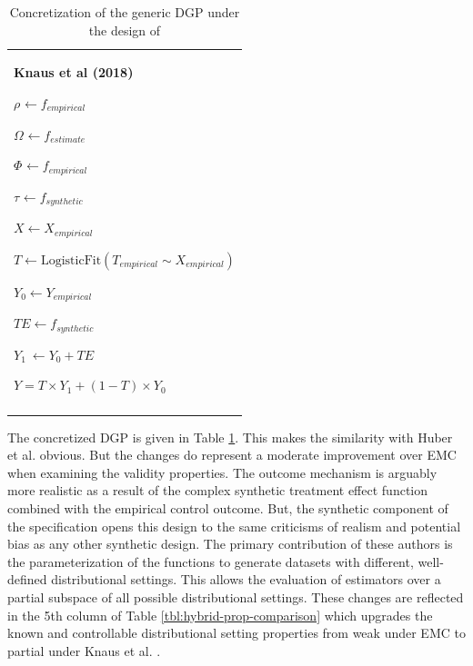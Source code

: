 \documentclass[../main.tex]{subfiles}
\begin{document}
\begin{table}[H]
             \centering
\begin{tabular}{p{3.14in}}
\hline
\multicolumn{1}{|p{3.14in}|}{\textbf{Knaus et al (2018)} \par  \(  \rho _{} \leftarrow f_{empirical}~ \)  \par  \(  \Omega _{} \leftarrow f_{estimate} \)  \par  \(  \Phi _{} \leftarrow f_{empirical} \)  \par  \(  \tau_{} \leftarrow f_{synthetic}~ \)  \par  \( X \leftarrow X_{empirical} \)  \par  \( T \leftarrow \text{LogisticFit} \left(  T_{empirical} \sim X_{empirical} \right)  \)  \par  \( Y_{0} \leftarrow Y_{empirical} \)  \par  \( TE \leftarrow f_{synthetic} \)  \par  \( Y_{1}~ \leftarrow Y_{0}+ TE \)  \par  \( Y = T \times Y_{1}+  \left( 1-T \right)  \times Y_{0} \)  \par } \\
\hhline{-}
\end{tabular}
\caption{Concretization of the generic DGP under the design of \textcite{Knaus2018MachineEvidence}}
\label{tbl:knaus-hybrid}
\end{table}

The concretized DGP is given in Table \ref{tbl:knaus-hybrid}. This makes the similarity with Huber et al. obvious. But the changes do represent a moderate improvement over EMC when examining the validity properties. The outcome mechanism is arguably more realistic as a result of the complex synthetic treatment effect function combined with the empirical control outcome. But, the synthetic component of the specification opens this design to the same criticisms of realism and potential bias as any other synthetic design. The primary contribution of these authors is the parameterization of the functions to generate datasets with different, well-defined distributional settings. This allows the evaluation of estimators over a partial subspace of all possible distributional settings. These changes are reflected in the 5th column of Table \ref{tbl:hybrid-prop-comparison} which upgrades the known and controllable distributional setting properties from weak under EMC to partial under Knaus et al. .\par
\end{document}
